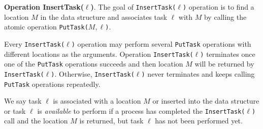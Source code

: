 \textbf{Operation InsertTask($\ell$)}.
The goal of \texttt{InsertTask(}$\ell$\texttt{)} operation is to find a location $M$ in the data structure and
associates task $\ell$ with $M$ by calling the atomic operation \texttt{PutTask(}$M,\ell$\texttt{)}.

Every \texttt{InsertTask(}$\ell$\texttt{)} operation may perform several \texttt{PutTask} operations with
different locations as the arguments. Operation \texttt{InsertTask(}$\ell$\texttt{)} terminates once one of the
\texttt{PutTask} operations succeeds and then location $M$ will be returned by \texttt{InsertTask(}$\ell$\texttt{)}.
Otherwise, \texttt{InsertTask(}$\ell$\texttt{)} never terminates and keeps
calling \texttt{PutTask} operations repeatedly.

We say task $\ell$ is associated with a location $M$ or inserted into the data structure or task $\ell$
is \emph{available} to perform if a process has completed the \texttt{InsertTask(}$\ell$\texttt{)} call and the location
$M$ is returned, but task $\ell$ has not been performed yet.

%
%
%


